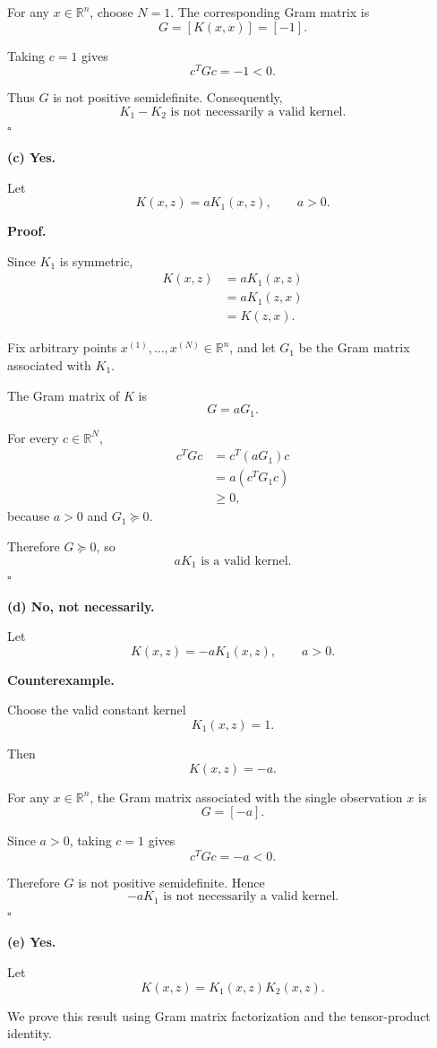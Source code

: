 \documentclass[11pt]{article}
\begin{document}
For any $x\in\mathbb R^n$, choose $N=1$.
The corresponding Gram matrix is
\[
G=[K(x,x)]=[-1].
\]

Taking $c=1$ gives
\[
c^TGc=-1<0.
\]

Thus $G$ is not positive semidefinite.
Consequently,
\[
\boxed{
K_1-K_2\text{ is not necessarily a valid kernel.}
}
\]
\hfill$\square$

\bigskip
\noindent\textbf{(c) Yes.}

Let
\[
K(x,z)=aK_1(x,z),
\qquad a>0.
\]

\textbf{Proof.}

Since $K_1$ is symmetric,
\[
\begin{aligned}
K(x,z)
&=aK_1(x,z)\\
&=aK_1(z,x)\\
&=K(z,x).
\end{aligned}
\]

Fix arbitrary points
$x^{(1)},\ldots,x^{(N)}\in\mathbb R^n$,
and let $G_1$ be the Gram matrix associated with $K_1$.

The Gram matrix of $K$ is
\[
G=aG_1.
\]

For every $c\in\mathbb R^N$,
\[
\begin{aligned}
c^TGc
&=c^T(aG_1)c\\
&=a(c^TG_1c)\\
&\geq0,
\end{aligned}
\]
because $a>0$ and $G_1\succeq0$.

Therefore $G\succeq0$, so
\[
\boxed{aK_1\text{ is a valid kernel.}}
\]
\hfill$\square$

\bigskip
\noindent\textbf{(d) No, not necessarily.}

Let
\[
K(x,z)=-aK_1(x,z),
\qquad a>0.
\]

\textbf{Counterexample.}

Choose the valid constant kernel
\[
K_1(x,z)=1.
\]

Then
\[
K(x,z)=-a.
\]

For any $x\in\mathbb R^n$, the Gram matrix
associated with the single observation $x$ is
\[
G=[-a].
\]

Since $a>0$, taking $c=1$ gives
\[
c^TGc=-a<0.
\]

Therefore $G$ is not positive semidefinite.
Hence
\[
\boxed{
-aK_1\text{ is not necessarily a valid kernel.}
}
\]
\hfill$\square$

\bigskip
\noindent\textbf{(e) Yes.}

Let
\[
K(x,z)=K_1(x,z)K_2(x,z).
\]

We prove this result using Gram matrix factorization
and the tensor-product identity.
\end{document}
